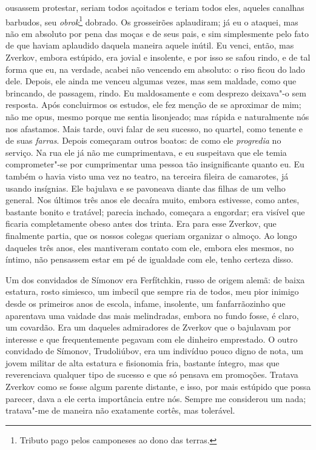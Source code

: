 ousassem protestar, seriam todos açoitados e teriam todos eles, aqueles
canalhas barbudos, seu \textit{obrok}\footnote{ Tributo pago pelos camponeses
ao dono das terras.} dobrado. Os grosseirões aplaudiram; já eu o ataquei, mas
não em absoluto por pena das moças e de seus pais, e sim simplesmente pelo fato
de que haviam aplaudido daquela maneira aquele inútil. Eu venci, então, mas
Zverkov, embora estúpido, era jovial e insolente, e por isso se safou rindo, e
de tal forma que eu, na verdade, acabei não vencendo em absoluto: o riso ficou
do lado dele.  Depois, ele ainda me venceu algumas vezes, mas sem maldade, como
que brincando, de passagem, rindo. Eu maldosamente e com desprezo deixava"-o sem
resposta. Após concluirmos os estudos, ele fez menção de se aproximar de mim;
não me opus, mesmo porque me sentia lisonjeado; mas rápida e naturalmente nós
nos afastamos. Mais tarde, ouvi falar de seu sucesso, no quartel, como tenente
e de suas \textit{farras}. Depois começaram outros boatos: de como ele
\textit{progredia} no serviço. Na rua ele já não me cumprimentava, e eu
suspeitava que ele temia comprometer"-se por cumprimentar uma pessoa tão
insignificante quanto eu. Eu também o havia visto uma vez no teatro, na
terceira fileira de camarotes, já usando insígnias. Ele bajulava e se pavoneava
diante das filhas de um velho general. Nos últimos três anos ele decaíra muito,
embora estivesse, como antes, bastante bonito e tratável; parecia inchado,
começara a engordar; era visível que ficaria completamente obeso antes dos
trinta. Era para esse Zverkov, que finalmente partia, que os nossos colegas
queriam organizar o almoço. Ao longo daqueles três anos, eles mantiveram
contato com ele, embora eles mesmos, no íntimo, não pensassem estar em pé de
igualdade com ele, tenho certeza disso.

Um dos convidados de Símonov era Ferfítchkin, russo de origem alemã: de
baixa estatura, rosto simiesco, um imbecil que sempre ria de todos, meu
pior inimigo desde os primeiros anos de escola, infame, insolente, um
fanfarrãozinho que aparentava uma vaidade das mais melindradas, embora
no fundo fosse, é claro, um covardão. Era um daqueles admiradores de
Zverkov que o bajulavam por interesse e que frequentemente pegavam com
ele dinheiro emprestado. O outro convidado de Símonov, Trudoliúbov, era
um indivíduo pouco digno de nota, um jovem militar de alta estatura e
fisionomia fria, bastante íntegro, mas que reverenciava qualquer tipo
de sucesso e que só pensava em promoções. Tratava Zverkov como se fosse
algum parente distante, e isso, por mais estúpido que possa parecer,
dava a ele certa importância entre nós. Sempre me considerou um nada;
tratava"-me de maneira não exatamente cortês, mas tolerável.

